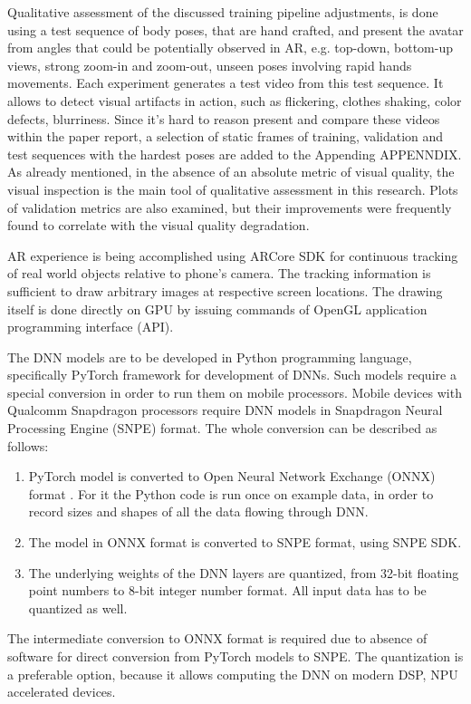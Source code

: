 Qualitative assessment of the discussed training pipeline adjustments, is done using a test sequence of body poses, that are hand crafted, and present the avatar from angles that could be potentially observed in AR, e.g. top-down, bottom-up views, strong zoom-in and zoom-out, unseen poses involving rapid hands movements. Each experiment generates a test video from this test sequence. It allows to detect visual artifacts in action, such as flickering, clothes shaking, color defects, blurriness. Since it's hard to reason present and compare these videos within the paper report, a selection of static frames of training, validation and test sequences with the hardest poses are added to the Appending \alert{APPENNDIX}. As already mentioned, in the absence of an absolute metric of visual quality, the visual inspection is the main tool of qualitative assessment in this research. Plots of validation metrics are also examined, but their improvements were frequently found to correlate with the visual quality degradation.


AR experience is being accomplished using ARCore SDK for continuous tracking of real world objects relative to phone's camera. The tracking information is sufficient to draw arbitrary images at respective screen locations. The drawing itself is done directly on GPU by issuing commands of OpenGL application programming interface (API).

The DNN models are to be developed in Python programming language, specifically PyTorch framework for development of DNNs. Such models require a special conversion in order to run them on mobile processors.  Mobile devices with Qualcomm Snapdragon processors require DNN models in Snapdragon Neural Processing Engine (SNPE) format. The whole conversion can be described as follows:
\begin{enumerate}
	\item  PyTorch model is converted to Open Neural Network Exchange (ONNX) format . For it the Python code is run once on example data, in order to record sizes and shapes of all the data flowing through DNN. 
	\item The model in ONNX format is converted to SNPE format, using SNPE SDK. 
	\item The underlying weights of the DNN layers are quantized, from 32-bit floating point numbers to 8-bit integer number format. All input data has to be quantized as well.
\end{enumerate}

The intermediate conversion to ONNX format is required due to absence of software for direct conversion from PyTorch models to SNPE. The quantization is a preferable option, because it allows computing the DNN on modern DSP, NPU accelerated devices.

